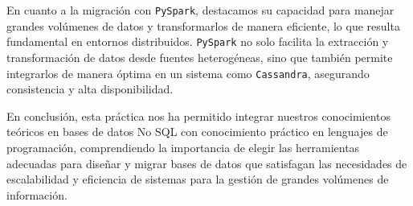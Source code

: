 \documentclass[]{article}
\begin{document}
En cuanto a la migración con \verb!PySpark!, destacamos su capacidad para
manejar grandes volúmenes de datos y transformarlos de manera eficiente, lo que
resulta fundamental en entornos distribuidos. \verb!PySpark! no solo facilita
la extracción y transformación de datos desde fuentes heterogéneas, sino que
también permite integrarlos de manera óptima en un sistema como
\verb!Cassandra!, asegurando consistencia y alta disponibilidad.

En conclusión, esta práctica nos ha permitido integrar nuestros conocimientos
teóricos en bases de datos No SQL con conocimiento práctico en lenguajes de
programación, comprendiendo la importancia de elegir las herramientas adecuadas
para diseñar y migrar bases de datos que satisfagan las necesidades de
escalabilidad y eficiencia de sistemas para la gestión de grandes volúmenes de
información.

\label{sec:conclusion}
\end{document}
